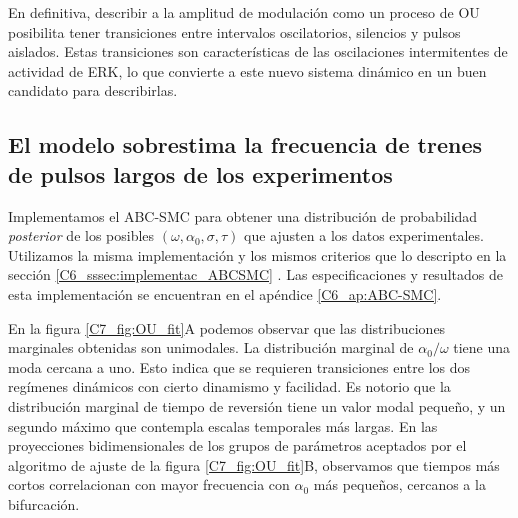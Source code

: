 \documentclass[./main.tex]{subfiles}
\begin{document}
En definitiva, describir a la amplitud de modulación como un proceso de OU posibilita tener transiciones entre intervalos oscilatorios, silencios y pulsos aislados. Estas transiciones son características de las oscilaciones intermitentes de actividad de ERK, lo que convierte a este nuevo sistema dinámico en un buen candidato para describirlas.


\subsection{El modelo sobrestima la frecuencia de trenes de pulsos largos de los experimentos}

Implementamos el ABC-SMC para obtener una distribución de probabilidad \textit{posterior} de los posibles $(\omega,\alpha_0,\sigma,\tau)$ que ajusten a los datos experimentales. Utilizamos la misma implementación y los mismos criterios que lo descripto en la sección \ref{C6_sssec:implementac_ABCSMC} . Las especificaciones y resultados de esta implementación se encuentran en el apéndice \ref{C6_ap:ABC-SMC}.

En la figura \ref{C7_fig:OU_fit}A podemos observar que las distribuciones marginales obtenidas son unimodales. La distribución marginal de $\alpha_0/\omega$ tiene una moda cercana a uno. Esto indica que se requieren transiciones entre los dos regímenes dinámicos con cierto dinamismo y facilidad. Es notorio que la distribución marginal de tiempo de reversión tiene un valor modal pequeño, y un segundo máximo que contempla escalas temporales más largas. En las proyecciones  bidimensionales de los grupos de parámetros aceptados por el algoritmo de ajuste de la figura \ref{C7_fig:OU_fit}B, observamos que tiempos más cortos correlacionan con mayor frecuencia con $\alpha_0$ más pequeños, cercanos a la bifurcación. 
\end{document}
